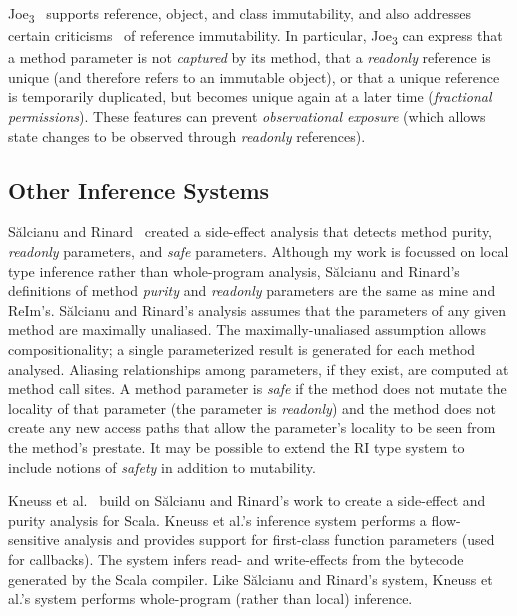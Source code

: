 \documentclass[letterpaper,11pt]{article}
\theoremstyle{definition}
\theoremstyle{remark}
\begin{document}
\mbox{Joe\textsubscript{3}}~\cite{joe3} supports reference, object, and class immutability, and
also addresses certain criticisms~\cite{boyland-readonly} of reference immutability.
In particular, \mbox{Joe\textsubscript{3}} can express that a method parameter
is not \emph{captured} by its method, that a \emph{readonly} reference is unique
(and therefore refers to an immutable object), or that a unique reference is
temporarily duplicated, but becomes unique again at a later time (\emph{fractional permissions}).
These features can prevent \emph{observational exposure} (which allows state changes
to be observed through \emph{readonly} references).


\subsection{Other Inference Systems}

Sălcianu and Rinard~\cite{purity-effect-java} created a side-effect analysis that
detects method purity, \emph{readonly} parameters, and \emph{safe} parameters.
Although my work is focussed on local type inference rather than whole-program analysis,
Sălcianu and Rinard's definitions of method \emph{purity} and \emph{readonly} parameters
are the same as mine and ReIm's.
Sălcianu and Rinard's analysis assumes that the parameters of any given method
are maximally unaliased.
The maximally-unaliased assumption allows compositionality;
a single parameterized result is generated for each method analysed.
Aliasing relationships among parameters, if they exist, are computed at
method call sites.
A method parameter is \emph{safe} if the method does not mutate the locality of
that parameter (the parameter is \emph{readonly}) and the method
does not create any new access paths that allow the parameter's locality
to be seen from the method's prestate.
It may be possible to extend the RI type system to include notions of \emph{safety}
in addition to mutability.

Kneuss et al.~\cite{effect-analysis-callbacks} build on Sălcianu and Rinard's work
to create a side-effect and purity analysis for Scala.
Kneuss et al.'s inference system performs a flow-sensitive analysis and
provides support for first-class function parameters (used for callbacks).
The system infers read- and write-effects from the bytecode generated
by the Scala compiler.
Like Sălcianu and Rinard's system, Kneuss et al.'s system performs whole-program
(rather than local) inference.
\end{document}
